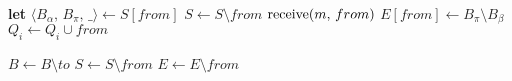 {  \begin{multicols}{2}
    \EmptyComment*{}
    \EmptyComment*{}
    \EmptyComment*{}
    \columnbreak
   {
    \textbf{let} $\langle B_\alpha,\, B_\pi,\, \_ \rangle \leftarrow S[from]$ \;
    $S \leftarrow S \setminus from$ \;
    {$\textup{receive}(m,\,from)$ \label{line:todeliver}}  %
    $E[from] \leftarrow B_\pi \setminus B_\beta$ \label{line:toexpect} \;%
    $Q_i \leftarrow Q_i \cup from$ \; %
  }
  \end{multicols}
  \BlankLine
  
  \begin{multicols}{2}
   {
    $B \leftarrow B \setminus to$
  }
   {
    $S \leftarrow S \setminus from$ \;
    $E \leftarrow E \setminus from$
  }
  \end{multicols}
  \BlankLine
}


